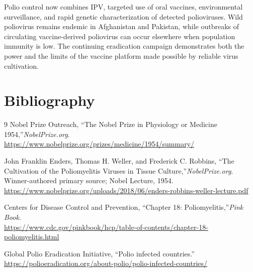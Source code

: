 Polio control now combines IPV, targeted use of oral vaccines, environmental surveillance, and rapid genetic characterization of detected polioviruses. Wild poliovirus remains endemic in Afghanistan and Pakistan, while outbreaks of circulating vaccine-derived poliovirus can occur elsewhere when population immunity is low. The continuing eradication campaign demonstrates both the power and the limits of the vaccine platform made possible by reliable virus cultivation.

\section{Bibliography}

\begin{thebibliography}{9}
Nobel Prize Outreach, ``The Nobel Prize in Physiology or Medicine 1954,''\emph{NobelPrize.org}.\\
\url{https://www.nobelprize.org/prizes/medicine/1954/summary/}

John Franklin Enders, Thomas H. Weller, and Frederick C. Robbins, ``The Cultivation of the Poliomyelitis Viruses in Tissue Culture,''\emph{NobelPrize.org}. Winner-authored primary source; Nobel Lecture, 1954.\\
\url{https://www.nobelprize.org/uploads/2018/06/enders-robbins-weller-lecture.pdf}

Centers for Disease Control and Prevention, ``Chapter 18: Poliomyelitis,''\emph{Pink Book}.\\
\url{https://www.cdc.gov/pinkbook/hcp/table-of-contents/chapter-18-poliomyelitis.html}

Global Polio Eradication Initiative, ``Polio infected countries.''\\
\url{https://polioeradication.org/about-polio/polio-infected-countries/}
\end{thebibliography}
